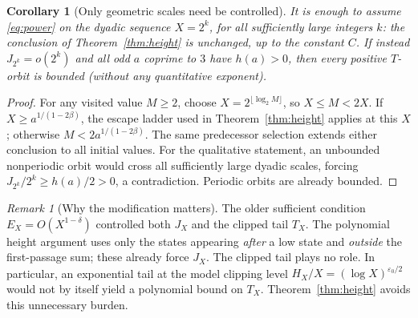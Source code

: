 \documentclass[11pt]{amsart}
\newtheorem{corollary}{Corollary}
\theoremstyle{remark}\newtheorem{remark}{Remark}
\begin{document}
\begin{corollary}[Only geometric scales need be controlled]
It is enough to assume \eqref{eq:power} on the dyadic sequence $X=2^k$, for all sufficiently large integers $k$: the conclusion of Theorem~\ref{thm:height} is unchanged, up to the constant $C$.
If instead $J_{2^k}=o(2^k)$ and all odd $a$ coprime to $3$ have $h(a)>0$, then every positive $T$-orbit is bounded (without any quantitative exponent).
\end{corollary}
\begin{proof}
For any visited value $M\ge2$, choose $X=2^{\lfloor\log_2 M\rfloor}$, so $X\le M<2X$.  If $X\ge a^{1/(1-2\beta)}$, the escape ladder used in Theorem~\ref{thm:height} applies at this $X$; otherwise $M<2a^{1/(1-2\beta)}$.  The same predecessor selection extends either conclusion to all initial values.  For the qualitative statement, an unbounded nonperiodic orbit would cross all sufficiently large dyadic scales, forcing $J_{2^k}/2^k\ge h(a)/2>0$, a contradiction.  Periodic orbits are already bounded.
\end{proof}

\begin{remark}[Why the modification matters]
The older sufficient condition $E_X=O(X^{1-\delta})$ controlled both $J_X$ and the clipped tail $T_X$.  The polynomial height argument uses only the states appearing \emph{after} a low state and \emph{outside} the first-passage sum; these already force $J_X$.  The clipped tail plays no role. In particular, an exponential tail at the model clipping level $H_X/X=(\log X)^{\varepsilon_0/2}$ would not by itself yield a polynomial bound on $T_X$.  Theorem~\ref{thm:height} avoids this unnecessary burden.
\end{remark}
\end{document}
